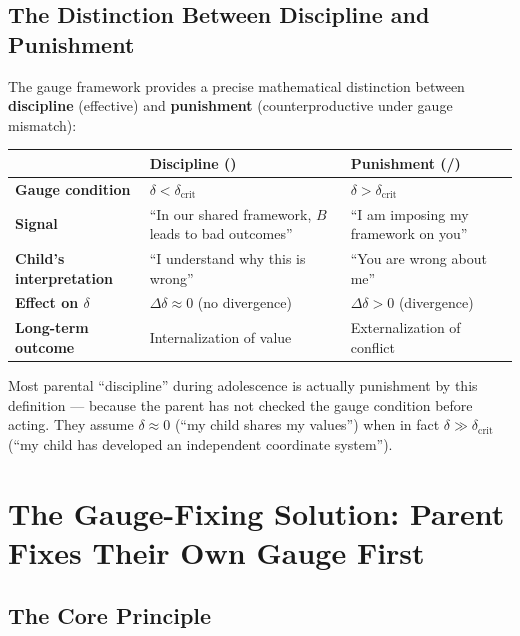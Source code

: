 \documentclass[11pt,a4paper]{article}
\begin{document}
\subsection{The Distinction Between Discipline and Punishment}

The gauge framework provides a precise mathematical distinction between \textbf{discipline} (effective) and \textbf{punishment} (counterproductive under gauge mismatch):

\begin{center}
\begin{tabular}{p{5cm} p{5cm} p{5cm}}
\toprule
\textbf{} & \textbf{Discipline ()} & \textbf{Punishment (/)} \\
\midrule
\textbf{Gauge condition} & $\delta < \delta_{\text{crit}}$ & $\delta > \delta_{\text{crit}}$ \\
\textbf{Signal} & ``In our shared framework, $B$ leads to bad outcomes'' & ``I am imposing my framework on you'' \\
\textbf{Child's interpretation} & ``I understand why this is wrong'' & ``You are wrong about me'' \\
\textbf{Effect on $\delta$} & $\Delta\delta \approx 0$ (no divergence) & $\Delta\delta > 0$ (divergence) \\
\textbf{Long-term outcome} & Internalization of value & Externalization of conflict \\
\bottomrule
\end{tabular}
\end{center}

Most parental ``discipline'' during adolescence is actually punishment by this definition — because the parent has not checked the gauge condition before acting. They assume $\delta \approx 0$ (``my child shares my values'') when in fact $\delta \gg \delta_{\text{crit}}$ (``my child has developed an independent coordinate system'').

\section{The Gauge-Fixing Solution: Parent Fixes Their Own Gauge First}
\label{sec:solution}

\subsection{The Core Principle}
\end{document}
